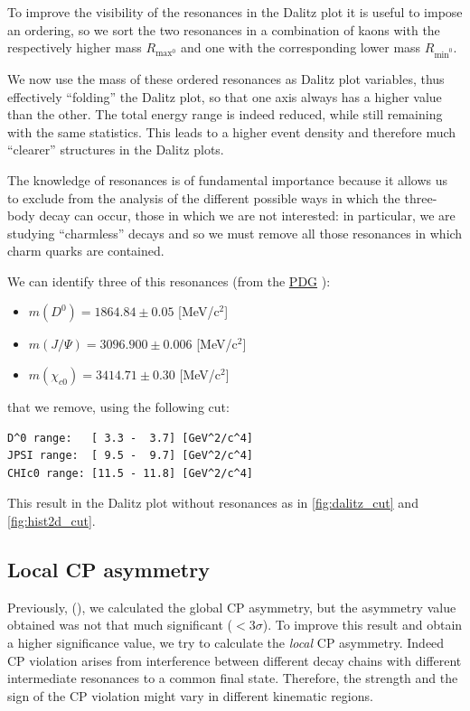 To improve the visibility of the resonances in the Dalitz plot it is useful to impose an ordering, so we sort the two resonances in a combination of kaons with the respectively higher mass $R_{\mathrm{max}^{0}}$ and one with the corresponding lower mass $R_{\mathrm{min}^{0}}$.

We now use the mass of these ordered resonances as Dalitz plot variables, thus effectively \enquote{folding} the Dalitz plot, so that one axis always has a higher value than the other. The total energy range is indeed reduced, while still remaining with the same statistics. This leads to a
higher event density and therefore much \enquote{clearer} structures in the Dalitz plots. 

The knowledge of resonances is of fundamental importance because it allows us to exclude from the analysis of the different possible ways in which the three-body decay can occur, those in which we are not interested: in particular, we are studying \enquote{charmless} decays and so we must remove all those resonances in which charm quarks are contained.

We can identify three of this resonances (from the \href{https://pdglive.lbl.gov/Viewer.action}{PDG} \cite{PDG}):

\begin{itemize}
    \item $m(D^{0}) = 1864.84 \pm 0.05$ [MeV/c$^2$]
    \item $m(J/\Psi) = 3096.900 \pm 0.006$ [MeV/c$^2$]
    \item $m(\chi_{c0}) = 3414.71 \pm 0.30$ [MeV/c$^2$]
\end{itemize}

that we remove, using the following cut: 

\begin{lstlisting}
D^0 range:   [ 3.3 -  3.7] [GeV^2/c^4]
JPSI range:  [ 9.5 -  9.7] [GeV^2/c^4]
CHIc0 range: [11.5 - 11.8] [GeV^2/c^4]
\end{lstlisting}

This result in the Dalitz plot without resonances as in \autoref{fig:dalitz_cut} and \autoref{fig:hist2d_cut}.

\subsection{Local CP asymmetry}

Previously, (), we calculated the global CP asymmetry, but the asymmetry value obtained was not that much significant ($<3\sigma$). To improve this result and obtain a higher significance value, we try to calculate the \emph{local} CP asymmetry.
Indeed CP violation arises from interference between different decay chains with different intermediate resonances to a common final state. Therefore, the strength and the sign of the CP violation might vary in different kinematic regions.

